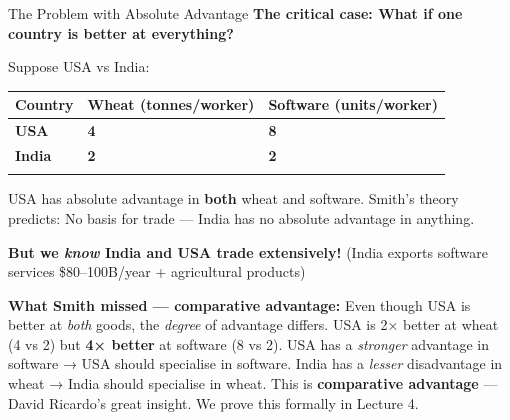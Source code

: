 \documentclass[
  ignorenonframetext,
  aspectratio=169,
]{beamer}
\makeatletter
\let\quarto@originallabel\label
\DeclareRobustCommand*{\label}[1]{\quarto@originallabel{#1}}
\makeatother
\begin{document}
\begin{frame}{The Problem with Absolute Advantage}
\label{the-problem-with-absolute-advantage}
\textbf{The critical case: What if one country is better at everything?}

Suppose USA vs India:

\begin{longtable}[]{@{}lll@{}}
\toprule\noalign{}
Country & Wheat (tonnes/worker) & Software (units/worker) \\
\midrule\noalign{}
\endhead
\textbf{USA} & \textbf{4} & \textbf{8} \\
\textbf{India} & \textbf{2} & \textbf{2} \\
\bottomrule\noalign{}
\end{longtable}

USA has absolute advantage in \textbf{both} wheat and software. Smith's
theory predicts: No basis for trade --- India has no absolute advantage
in anything.

\textbf{But we \emph{know} India and USA trade extensively!} (India
exports software services \$80--100B/year + agricultural products)

\textbf{What Smith missed --- comparative advantage:} Even though USA is
better at \emph{both} goods, the \emph{degree} of advantage differs. USA
is 2× better at wheat (4 vs 2) but \textbf{4× better} at software (8 vs
2). USA has a \emph{stronger} advantage in software → USA should
specialise in software. India has a \emph{lesser} disadvantage in wheat
→ India should specialise in wheat. This is \textbf{comparative
advantage} --- David Ricardo's great insight. We prove this formally in
Lecture 4.
\end{frame}
\end{document}
